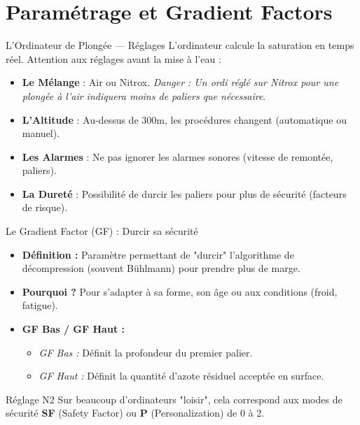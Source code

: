 \section{Paramétrage et Gradient Factors}

\begin{frame}{L'Ordinateur de Plongée — Réglages}
    L'ordinateur calcule la saturation en temps réel. Attention aux réglages avant la mise à l'eau :
    \begin{itemize}
        \item \textbf{Le Mélange} : Air ou Nitrox. \textit{\textcolor{ffessmred}{Danger} : Un ordi réglé sur Nitrox 
            pour une plongée à l'air indiquera moins de paliers que nécessaire}.
        \item \textbf{L'Altitude} : Au-dessus de 300m, les procédures changent (automatique ou manuel).
        \item \textbf{Les Alarmes} : Ne pas ignorer les alarmes sonores (vitesse de remontée, paliers).
        \item \textbf{La Dureté} : Possibilité de durcir les paliers pour plus de sécurité 
            (facteurs de risque).
    \end{itemize}
\end{frame}

\begin{frame}{Le Gradient Factor (GF) : Durcir sa sécurité}
    \begin{itemize}
        \item \textbf{Définition :} Paramètre permettant de "durcir" l'algorithme de décompression (souvent Bühlmann) pour prendre plus de marge.
        \item \textbf{Pourquoi ?} Pour s'adapter à sa forme, son âge ou aux conditions (froid, fatigue).
        \item \textbf{GF Bas / GF Haut :}
        \begin{itemize}
            \item \textit{GF Bas :} Définit la profondeur du premier palier.
            \item \textit{GF Haut :} Définit la quantité d'azote résiduel acceptée en surface.
        \end{itemize}
    \end{itemize}
    \begin{alertblock}{Réglage N2}
        Sur beaucoup d'ordinateurs "loisir", cela correspond aux modes de sécurité \textbf{SF} (Safety Factor) ou \textbf{P} (Personalization) de 0 à 2.
    \end{alertblock}
\end{frame}
